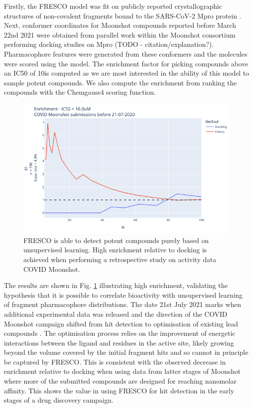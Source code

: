 Firstly, the FRESCO model was fit on publicly reported crystallographic structures of non-covalent fragments bound to the SARS-CoV-2 Mpro protein \cite{Douangamath2020XChem}. Next, conformer coordinates for Moonshot compounds reported before March 22nd 2021 were obtained from parallel work within the Moonshot consortium performing docking studies on Mpro (TODO - citation/explanation?). Pharmacophore features were generated from these conformers and the molecules were scored using the model. The enrichment factor for picking compounds above an IC50 of 10\uM is computed as we are most interested in the ability of this model to sample potent compounds. We also compute the enrichment from ranking the compounds with the Chemgauss4 scoring function.

\begin{figure}
    \centering
    \includegraphics[width=\textwidth]{Chapters/Ch2/Figs/enrichment_vs_docking.png}
    \caption{FRESCO is able to detect potent compounds purely based on unsupervised learning. High enrichment relative to docking is achieved when performing a retrospective study on activity data COVID Moonshot.}
    \label{fig:moonshot_enrichment_vs_docking}
\end{figure}

The results are shown in Fig. \ref{fig:moonshot_enrichment_vs_docking} illustrating high enrichment, validating the hypothesis that it is possible to correlate bioactivity with unsupervised learning of fragment pharmacophore distributions. The date 21st July 2021 marks when additional experimental data was released and the direction of the COVID Moonshot campaign shifted from hit detection to optimisation of existing lead compounds \cite{Moonshot2021DataRelease}. The optimisation process relies on the improvement of energetic interactions between the ligand and residues in the active site, likely growing beyond the volume covered by the initial fragment hits and so cannot in principle be captured by FRESCO. This is consistent with the observed decrease in enrichment relative to docking when using data from latter stages of Moonshot where more of the submitted compounds are designed for reaching nanomolar affinity. This shows the value in using FRESCO for hit detection in the early stages of a drug discovery campaign.

